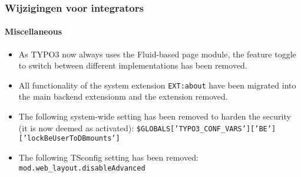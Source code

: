 %

\begin{frame}[fragile]
	\frametitle{Wijzigingen voor integrators}
	\framesubtitle{Miscellaneous}

	\begin{itemize}
		\item As TYPO3 now always uses the Fluid-based page module, the feature
			toggle to switch between different implementations has been removed.
		\item All functionality of the system extension \texttt{EXT:about}
			have been migrated into the main backend extensionm and the
			extension removed.
		\item The following system-wide setting has been removed to harden the security
			(it is now deemed as activated):\newline
			\smaller\texttt{\$GLOBALS['TYPO3\_CONF\_VARS']['BE']['lockBeUserToDBmounts']}\normalsize
		\item The following TSconfig setting has been removed:\newline
			\smaller\texttt{mod.web\_layout.disableAdvanced}\normalsize
	\end{itemize}

\end{frame}

